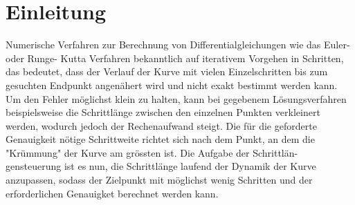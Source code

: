 %
%
%
\section{Einleitung\label{steps:section:einleitung}}

Numerische Verfahren zur Berechnung von Differentialgleichungen wie das Euler- oder Runge-
Kutta Verfahren bekanntlich auf iterativem Vorgehen in Schritten, das bedeutet, dass der Verlauf
der Kurve mit vielen Einzelschritten bis zum gesuchten Endpunkt angenähert wird und nicht exakt
bestimmt werden kann. Um den Fehler möglichst klein zu halten,
kann bei gegebenem Lösungsverfahren beispielsweise die Schrittlänge zwischen den einzelnen Punkten verkleinert werden, wodurch
jedoch der Rechenaufwand steigt. Die für die geforderte Genauigkeit nötige Schrittweite richtet sich
nach dem Punkt, an dem die "Krümmung" der Kurve am grössten ist. Die Aufgabe der Schrittlän-
gensteuerung ist es nun, die Schrittlänge laufend der Dynamik der Kurve anzupassen, sodass der
Zielpunkt mit möglichst wenig Schritten und der erforderlichen Genauigket berechnet werden
kann.

